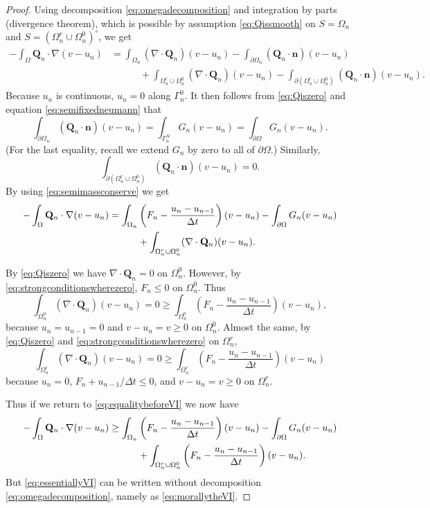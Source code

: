 \documentclass[final,leqno,onefignum,onetabnum]{siamltex1213bueler}
\newcommand\bn{\mathbf{n}}
\newcommand\bQ{\mathbf{Q}}
\newcommand{\Div}{\nabla\cdot}
\renewcommand{\grad}{\nabla}
\begin{document}
\begin{proof}
Using decomposition \eqref{eq:omegadecomposition} and integration by parts (divergence theorem), which is possible by assumption \eqref{eq:Qissmooth} on $S=\Omega_n$ and $S=(\Omega_n^r \cup \Omega_n^0)^\circ$, we get
\begin{align*}
-\int_{\Omega} \bQ_n \cdot \grad(v-u_n) &= \int_{\Omega_n} (\Div \bQ_n) (v-u_n) - \int_{\partial \Omega_n} (\bQ_n \cdot \bn) (v-u_n) \\
  &\qquad\quad + \int_{\Omega_n^r \cup \Omega_n^0} (\Div \bQ_n) (v-u_n) - \int_{\partial(\Omega_n^r \cup \Omega_n^0)} (\bQ_n \cdot \bn) (v-u_n).
\end{align*}
Because $u_n$ is continuous, $u_n=0$ along $\Gamma_n^0$.  It then follows from \eqref{eq:Qiszero} and equation \eqref{eq:semifixedneumann} that
       $$\int_{\partial \Omega_n} (\bQ_n \cdot \bn) (v-u_n) = \int_{\Gamma_n^N} G_n (v-u_n) = \int_{\partial \Omega} G_n (v-u_n).$$
(For the last equality, recall we extend $G_n$ by zero to all of $\partial \Omega$.)
Similarly,
       $$\int_{\partial(\Omega_n^r \cup \Omega_n^0)} (\bQ_n \cdot \bn) (v-u_n) = 0.$$
By using \eqref{eq:semimassconserve} we get
\begin{align}
-\int_{\Omega} \bQ_n \cdot \grad(v-u_n) &= \int_{\Omega_n} \left(F_n - \frac{u_n - u_{n-1}}{\Delta t}\right) (v-u_n) - \int_{\partial \Omega} G_n (v-u_n) \label{eq:equalitybeforeVI} \\
  &\qquad\quad + \int_{\Omega_n^r \cup \Omega_n^0} (\Div \bQ_n) (v-u_n). \notag
\end{align}

By \eqref{eq:Qiszero} we have $\Div \bQ_n=0$ on $\Omega_n^0$.  However, by \eqref{eq:strongconditionswherezero}, $F_n \le 0$ on $\Omega_n^0$.  Thus
    $$\int_{\Omega_n^0} (\Div \bQ_n) (v-u_n) = 0 \ge \int_{\Omega_n^0} \left(F_n - \frac{u_n - u_{n-1}}{\Delta t}\right) (v-u_n),$$
because $u_n=u_{n-1}=0$ and $v-u_n = v \ge 0$ on $\Omega_n^0$.  Almost the same, by \eqref{eq:Qiszero} and \eqref{eq:strongconditionswherezero} on $\Omega_n^r$,
    $$\int_{\Omega_n^r} (\Div \bQ_n) (v-u_n) = 0 \ge \int_{\Omega_n^r} \left(F_n - \frac{u_n - u_{n-1}}{\Delta t}\right) (v-u_n)$$
because $u_n=0$, $F_n + u_{n-1}/\Delta t \le 0$, and $v-u_n = v \ge 0$ on $\Omega_n^r$.  

Thus if we return to \eqref{eq:equalitybeforeVI} we now have
\begin{align}
-\int_{\Omega} \bQ_n \cdot \grad(v-u_n) &\ge \int_{\Omega_n} \left(F_n - \frac{u_n - u_{n-1}}{\Delta t}\right) (v-u_n) - \int_{\partial \Omega} G_n (v-u_n) \label{eq:essentiallyVI} \\
  &\qquad\quad + \int_{\Omega_n^r \cup \Omega_n^0} \left(F_n - \frac{u_n - u_{n-1}}{\Delta t}\right) (v-u_n). \notag
\end{align}
But \eqref{eq:essentiallyVI} can be written without decomposition \eqref{eq:omegadecomposition}, namely as \eqref{eq:morallytheVI}.
\end{proof}
\end{document}
